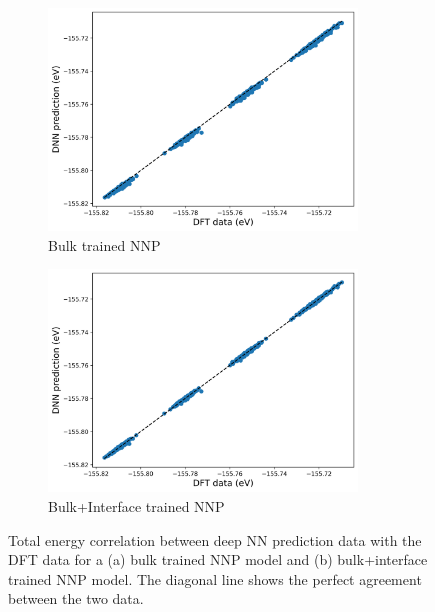 \begin{figure}[tbhp!]
	\centering
	\begin{subfigure}{0.47\textwidth}
		\centering

		\includegraphics[width=0.9\textwidth]{images/bulk_NN_on_interface/2_e_peratom.png}
		\caption{Bulk trained NNP}
		\label{fig:corr_bulk_NN_E}
	\end{subfigure}
	\hfill
	\begin{subfigure}{0.47\textwidth}
		\centering

		\includegraphics[width=0.9\textwidth]{images/bulk+interface_NN_on_interface/2_e_peratom.png}
		\caption{Bulk+Interface trained NNP}
		\label{fig:corr_bulk+interface_NN_E}
	\end{subfigure}
	\caption{Total energy correlation between deep NN prediction data with
		the DFT data
		for a
		(a) bulk trained NNP model and (b) bulk+interface trained NNP
		model. The
		diagonal line shows the perfect agreement between the two
		data.}
	\label{fig:corr_E}
\end{figure}


